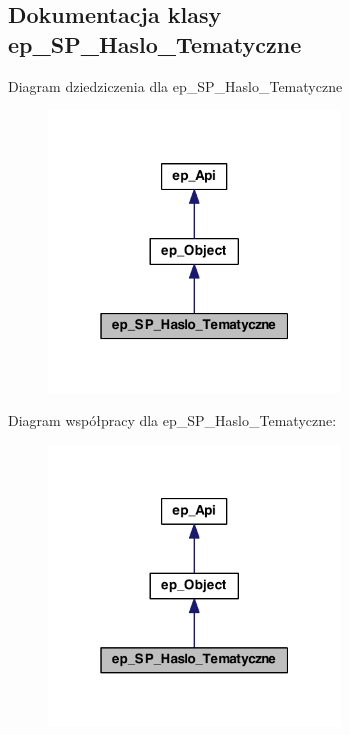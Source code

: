 \hypertarget{classep___s_p___haslo___tematyczne}{\subsection{Dokumentacja klasy ep\-\_\-\-S\-P\-\_\-\-Haslo\-\_\-\-Tematyczne}
\label{classep___s_p___haslo___tematyczne}
}


Diagram dziedziczenia dla ep\-\_\-\-S\-P\-\_\-\-Haslo\-\_\-\-Tematyczne\nopagebreak
\begin{figure}[H]
\begin{center}
\leavevmode
\includegraphics[width=220pt]{classep___s_p___haslo___tematyczne__inherit__graph}
\end{center}
\end{figure}


Diagram współpracy dla ep\-\_\-\-S\-P\-\_\-\-Haslo\-\_\-\-Tematyczne\-:\nopagebreak
\begin{figure}[H]
\begin{center}
\leavevmode
\includegraphics[width=220pt]{classep___s_p___haslo___tematyczne__coll__graph}
\end{center}
\end{figure}
